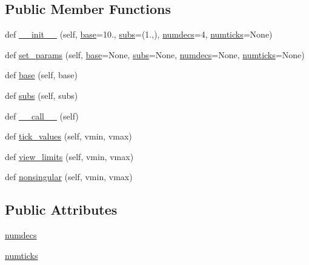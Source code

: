 \subsection*{Public Member Functions}
\begin{DoxyCompactItemize}
\item 
def \hyperlink{classmatplotlib_1_1ticker_1_1LogLocator_a175402f3869188b24ba81a24757716e5}{\+\_\+\+\_\+init\+\_\+\+\_\+} (self, \hyperlink{classmatplotlib_1_1ticker_1_1LogLocator_a8947a585727641d29da009762eb0112f}{base}=10., \hyperlink{classmatplotlib_1_1ticker_1_1LogLocator_a755aa8c4e4262890ce64bc0c0a38993e}{subs}=(1.,), \hyperlink{classmatplotlib_1_1ticker_1_1LogLocator_ab606e4a57ea96a790bb2b63c3fcf93fe}{numdecs}=4, \hyperlink{classmatplotlib_1_1ticker_1_1LogLocator_a77bbfb4efea21cfc057a79ed4eb81c17}{numticks}=None)
\item 
def \hyperlink{classmatplotlib_1_1ticker_1_1LogLocator_a4747347c5cc05a9b664aeebfb8af3d35}{set\+\_\+params} (self, \hyperlink{classmatplotlib_1_1ticker_1_1LogLocator_a8947a585727641d29da009762eb0112f}{base}=None, \hyperlink{classmatplotlib_1_1ticker_1_1LogLocator_a755aa8c4e4262890ce64bc0c0a38993e}{subs}=None, \hyperlink{classmatplotlib_1_1ticker_1_1LogLocator_ab606e4a57ea96a790bb2b63c3fcf93fe}{numdecs}=None, \hyperlink{classmatplotlib_1_1ticker_1_1LogLocator_a77bbfb4efea21cfc057a79ed4eb81c17}{numticks}=None)
\item 
def \hyperlink{classmatplotlib_1_1ticker_1_1LogLocator_a8947a585727641d29da009762eb0112f}{base} (self, base)
\item 
def \hyperlink{classmatplotlib_1_1ticker_1_1LogLocator_a755aa8c4e4262890ce64bc0c0a38993e}{subs} (self, subs)
\item 
def \hyperlink{classmatplotlib_1_1ticker_1_1LogLocator_a7cdff5eaec6ed65b4777dc10e45b1937}{\+\_\+\+\_\+call\+\_\+\+\_\+} (self)
\item 
def \hyperlink{classmatplotlib_1_1ticker_1_1LogLocator_a3fb4f4fa3a011e59f572b2d09e5d7a58}{tick\+\_\+values} (self, vmin, vmax)
\item 
def \hyperlink{classmatplotlib_1_1ticker_1_1LogLocator_a5c96306332580532457c75c779a5d023}{view\+\_\+limits} (self, vmin, vmax)
\item 
def \hyperlink{classmatplotlib_1_1ticker_1_1LogLocator_ae8dc88adcdc530e6cb4d8af788edb2ff}{nonsingular} (self, vmin, vmax)
\end{DoxyCompactItemize}
\subsection*{Public Attributes}
\begin{DoxyCompactItemize}
\item 
\hyperlink{classmatplotlib_1_1ticker_1_1LogLocator_ab606e4a57ea96a790bb2b63c3fcf93fe}{numdecs}
\item 
\hyperlink{classmatplotlib_1_1ticker_1_1LogLocator_a77bbfb4efea21cfc057a79ed4eb81c17}{numticks}
\end{DoxyCompactItemize}
